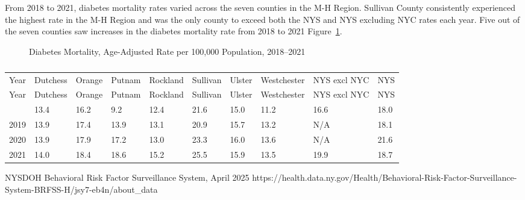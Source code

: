 \documentclass[
  english,
  letterpaper,
]{report}
\begin{document}
From 2018 to 2021, diabetes mortality rates varied across the seven
counties in the M-H Region. Sullivan County consistently experienced the
highest rate in the M-H Region and was the only county to exceed both
the NYS and NYS excluding NYC rates each year. Five out of the seven
counties saw increases in the diabetes mortality rate from 2018 to 2021
Figure~\ref{fig-dm-mortal-aar}.

\begin{figure}


\caption{\label{fig-dm-mortal-aar}Diabetes Mortality, Age-Adjusted Rate
per 100,000 Population, 2018--2021}

\end{figure}%

\begin{longtable}[]{@{}llllllllll@{}}

\caption{\label{tbl-dm-mortal-aar}Diabetes Mortality, Age-Adjusted Rate
per 100,000 Population, 2018--2021}

\tabularnewline

\caption{}\label{T_1c964}\tabularnewline
\toprule\noalign{}
Year & Dutchess & Orange & Putnam & Rockland & Sullivan & Ulster &
Westchester & NYS excl NYC & NYS \\
\midrule\noalign{}
\endfirsthead
\toprule\noalign{}
Year & Dutchess & Orange & Putnam & Rockland & Sullivan & Ulster &
Westchester & NYS excl NYC & NYS \\
\midrule\noalign{}
\endhead
\bottomrule\noalign{}
\endlastfoot
2018 & 13.4 & 16.2 & 9.2 & 12.4 & 21.6 & 15.0 & 11.2 & 16.6 & 18.0 \\
2019 & 13.9 & 17.4 & 13.9 & 13.1 & 20.9 & 15.7 & 13.2 & N/A & 18.1 \\
2020 & 13.9 & 17.9 & 17.2 & 13.0 & 23.3 & 16.0 & 13.6 & N/A & 21.6 \\
2021 & 14.0 & 18.4 & 18.6 & 15.2 & 25.5 & 15.9 & 13.5 & 19.9 & 18.7 \\

\end{longtable}

\begin{tcolorbox}[enhanced jigsaw, breakable, leftrule=.75mm, title=\textcolor{quarto-callout-note-color}{\faInfo}\hspace{0.5em}{Source}, bottomrule=.15mm, opacityback=0, left=2mm, colback=white, bottomtitle=1mm, coltitle=black, colbacktitle=quarto-callout-note-color!10!white, colframe=quarto-callout-note-color-frame, opacitybacktitle=0.6, toptitle=1mm, titlerule=0mm, arc=.35mm, rightrule=.15mm, toprule=.15mm]

NYSDOH Behavioral Risk Factor Surveillance System, April 2025
https://health.data.ny.gov/Health/Behavioral-Risk-Factor-Surveillance-System-BRFSS-H/jsy7-eb4n/about\_data

\end{tcolorbox}
\end{document}
